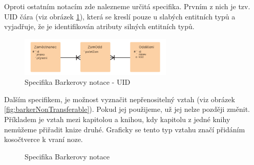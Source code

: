 \documentclass[czech,bachelor,public,dept460,male,oneside]{diploma}
\begin{document}
		Oproti ostatním notacím zde nalezneme určitá specifika. Prvním z nich je tzv. UID čára (viz obrázek \ref{fig:barkerUid}), která se kreslí pouze u slabých entitních typů a vyjadřuje, že je identifikován atributy silných entitních typů. 
		
		\begin{figure}[!h]
			\centering
			\includegraphics[width=0.65\textwidth]{Figures/BarkerUid}
			\caption[Specifika Barkerovy notace - UID]{Specifika Barkerovy notace - UID}
			\label{fig:barkerUid}
		\end{figure}
		
		Dalším specifikem, je možnost vyznačit nepřenositelný vztah (viz obrázek \ref{fig:barkerNonTransferable}). Pokud jej použijeme, už jej nelze později změnit. Příkladem je vztah mezi kapitolou a knihou, kdy kapitolu z jedné knihy nemůžeme přiřadit knize druhé. Graficky se tento typ vztahu značí přidáním kosočtverce k vraní noze.
		
		\begin{figure}[!h]
			\centering
			\qquad
			\caption[Specifika Barkerovy notace]{Specifika Barkerovy notace}
		\end{figure}
	
\end{document}
